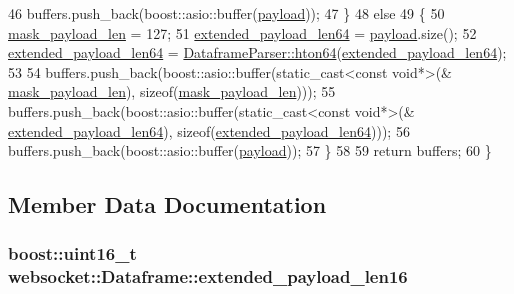 \begin{DoxyCode}
46             buffers.push\_back(boost::asio::buffer(\hyperlink{structwebsocket_1_1Dataframe_a809c2f387810fa2accd6602a290a6876}{payload}));
47         \}
48         \textcolor{keywordflow}{else}
49         \{
50             \hyperlink{structwebsocket_1_1Dataframe_aef0527ee72ea7de1fe50914200bd3fcf}{mask\_payload\_len} = 127;
51             \hyperlink{structwebsocket_1_1Dataframe_a2c3c0a890d9e982cf004eec1e85d47af}{extended\_payload\_len64} = \hyperlink{structwebsocket_1_1Dataframe_a809c2f387810fa2accd6602a290a6876}{payload}.size();
52             \hyperlink{structwebsocket_1_1Dataframe_a2c3c0a890d9e982cf004eec1e85d47af}{extended\_payload\_len64} = 
      \hyperlink{classwebsocket_1_1DataframeParser_ac0ffb851ee6870bc8672ef6408fce939}{DataframeParser::hton64}(\hyperlink{structwebsocket_1_1Dataframe_a2c3c0a890d9e982cf004eec1e85d47af}{extended\_payload\_len64});
53 
54             buffers.push\_back(boost::asio::buffer(static\_cast<const void*>(&
      \hyperlink{structwebsocket_1_1Dataframe_aef0527ee72ea7de1fe50914200bd3fcf}{mask\_payload\_len}), \textcolor{keyword}{sizeof}(\hyperlink{structwebsocket_1_1Dataframe_aef0527ee72ea7de1fe50914200bd3fcf}{mask\_payload\_len})));
55             buffers.push\_back(boost::asio::buffer(static\_cast<const void*>(&
      \hyperlink{structwebsocket_1_1Dataframe_a2c3c0a890d9e982cf004eec1e85d47af}{extended\_payload\_len64}), \textcolor{keyword}{sizeof}(\hyperlink{structwebsocket_1_1Dataframe_a2c3c0a890d9e982cf004eec1e85d47af}{extended\_payload\_len64})));
56             buffers.push\_back(boost::asio::buffer(\hyperlink{structwebsocket_1_1Dataframe_a809c2f387810fa2accd6602a290a6876}{payload}));
57         \}
58 
59         \textcolor{keywordflow}{return} buffers;
60     \}
\end{DoxyCode}


\subsection{Member Data Documentation}
\subsubsection[{\texorpdfstring{extended\+\_\+payload\+\_\+len16}{extended_payload_len16}}]{\setlength{\rightskip}{0pt plus 5cm}boost\+::uint16\+\_\+t websocket\+::\+Dataframe\+::extended\+\_\+payload\+\_\+len16}\hypertarget{structwebsocket_1_1Dataframe_a7dc588e87e310b596c4bcdc15d94c87d}{}\label{structwebsocket_1_1Dataframe_a7dc588e87e310b596c4bcdc15d94c87d}
